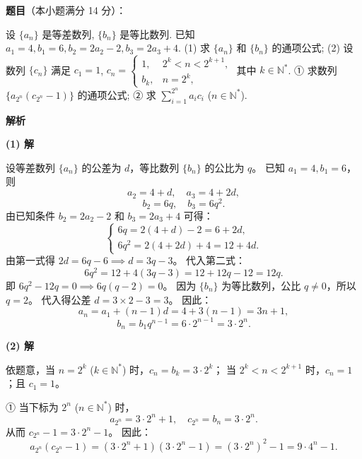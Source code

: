 \begin{answer}


\end{answer}
\begin{answer}

\textbf{题目}（本小题满分 14 分）：

设 $\{a_n\}$ 是等差数列, $\{b_n\}$ 是等比数列. 已知 $a_1 = 4, b_1 = 6, b_2 = 2a_2 - 2, b_3 = 2a_3 + 4$.
(1) 求 $\{a_n\}$ 和 $\{b_n\}$ 的通项公式;
(2) 设数列 $\{c_n\}$ 满足 $c_1 = 1$, $c_n = \begin{cases} 1, & 2^k < n < 2^{k+1}, \\ b_k, & n = 2^k, \end{cases}$ 其中 $k \in \mathbb{N}^*$.
① 求数列 $\{a_{2^n}(c_{2^n} - 1)\}$ 的通项公式;
② 求 $\sum_{i=1}^{2^n} a_i c_i$ ($n \in \mathbb{N}^*$).

\textbf{解析}

\textbf{(1) 解}

设等差数列 $\{a_n\}$ 的公差为 $d$，等比数列 $\{b_n\}$ 的公比为 $q$。
已知 $a_1 = 4, b_1 = 6$，则
\nopagebreak[4]
\[a_2 = 4 + d,\quad a_3 = 4 + 2d,\]
\nopagebreak[4]
\[b_2 = 6q,\quad b_3 = 6q^2.\]
由已知条件 $b_2 = 2a_2 - 2$ 和 $b_3 = 2a_3 + 4$ 可得：
\nopagebreak[4]
\[
\begin{cases}
6q = 2(4 + d) - 2 = 6 + 2d, \\
6q^2 = 2(4 + 2d) + 4 = 12 + 4d.
\end{cases}
\]
由第一式得 $2d = 6q - 6 \implies d = 3q - 3$。
代入第二式：
\nopagebreak[4]
\[6q^2 = 12 + 4(3q - 3) = 12 + 12q - 12 = 12q.\]
即 $6q^2 - 12q = 0 \implies 6q(q - 2) = 0$。
因为 $\{b_n\}$ 为等比数列，公比 $q \neq 0$，所以 $q = 2$。
代入得公差 $d = 3 \times 2 - 3 = 3$。
因此：
\nopagebreak[4]
\[a_n = a_1 + (n - 1)d = 4 + 3(n - 1) = 3n + 1,\]
\nopagebreak[4]
\[b_n = b_1 q^{n-1} = 6 \cdot 2^{n-1} = 3 \cdot 2^n.\]

\textbf{(2) 解}

依题意，当 $n = 2^k$ ($k \in \mathbb{N}^*$) 时，$c_n = b_k = 3 \cdot 2^k$；
当 $2^k < n < 2^{k+1}$ 时，$c_n = 1$；且 $c_1 = 1$。

① 当下标为 $2^n$ ($n \in \mathbb{N}^*$) 时，
\nopagebreak[4]
\[a_{2^n} = 3 \cdot 2^n + 1,\quad c_{2^n} = b_n = 3 \cdot 2^n.\]
从而 $c_{2^n} - 1 = 3 \cdot 2^n - 1$。
因此：
\nopagebreak[4]
\[a_{2^n}(c_{2^n} - 1) = (3 \cdot 2^n + 1)(3 \cdot 2^n - 1) = (3 \cdot 2^n)^2 - 1 = 9 \cdot 4^n - 1.\]


\end{answer}
